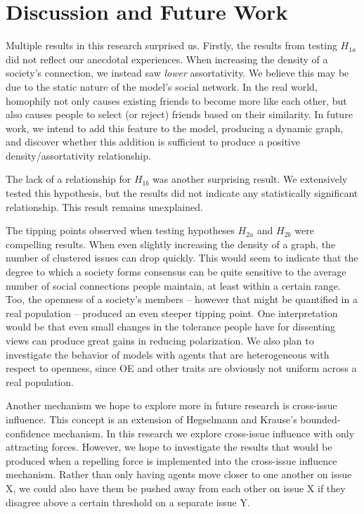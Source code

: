 \section{Discussion and Future Work}

Multiple results in this research surprised us. Firstly, the results from
testing $H_{1a}$ did not reflect our anecdotal experiences. When increasing the
density of a society's connection, we instead saw \textit{lower} assortativity.
We believe this may be due to the static nature of the model's social network.
In the real world, homophily not only causes existing friends to become more
like each other, but also causes people to select (or reject) friends based on
their similarity. In future work, we intend to add this feature to the model,
producing a dynamic graph, and discover whether this addition is sufficient to
produce a positive density/assortativity relationship.

The lack of a relationship for $H_{1b}$ was another surprising result. We
extensively tested this hypothesis, but the results did not indicate any
statistically significant relationship. This result remains unexplained.

The tipping points observed when testing hypotheses $H_{2a}$ and $H_{2b}$ were
compelling results. When even slightly increasing the density of a graph, the
number of clustered issues can drop quickly. This would seem to indicate that
the degree to which a society forms consensus can be quite sensitive to the
average number of social connections people maintain, at least within a certain
range. Too, the openness of a society's members -- however that might be
quantified in a real population -- produced an even steeper tipping point. One
interpretation would be that even small changes in the tolerance people have
for dissenting views can produce great gains in reducing polarization. We also
plan to investigate the behavior of models with agents that are heterogeneous 
with respect to openness, since OE and other traits are obviously not uniform
across a real population.

Another mechanism we hope to explore more in future research is cross-issue
influence. This concept is an extension of Hegselmann and Krause's
bounded-confidence mechanism. In this research we explore cross-issue influence
with only attracting forces. However, we hope to investigate the results that
would be produced when a repelling force is implemented into the cross-issue
influence mechanism. Rather than only having agents move closer to one another
on issue X, we could also have them be pushed away from each other on issue X
if they disagree above a certain threshold on a separate issue Y.    
